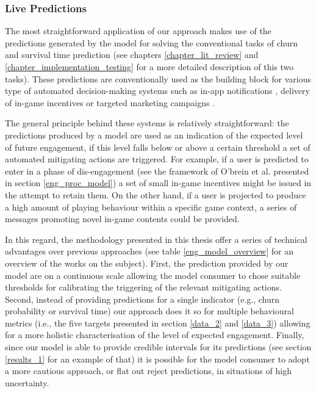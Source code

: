 \subsubsection{Live Predictions}
The most straightforward application of our approach makes use of the predictions generated by the model for solving the conventional tasks of churn and survival time prediction (see chapters \ref{chapter_lit_review} and \ref{chapter_implementation_testing} for a more detailed description of this two tasks). These predictions are conventionally used as the building block for various type of automated decision-making systems such as in-app notifications \cite{milovsevic2017early}, delivery of in-game incentives or targeted marketing campaigns \cite{el2016game, el2021game}. 

The general principle behind these systems is relatively straightforward: the predictions produced by a model are used as an indication of the expected level of future engagement, if this level falls below or above a certain threshold a set of automated mitigating actions are triggered. For example, if a user is predicted to enter in a phase of dis-engagement (see the framework of O'brein et al. presented in section \ref{eng_proc_model}) a set of small in-game incentives might be issued in the attempt to retain them. On the other hand, if a user is projected to produce a high amount of playing behaviour within a specific game context, a series of messages promoting novel in-game contents could be provided.

In this regard, the methodology presented in this thesis offer a series of technical advantages over previous approaches (see table \ref{eng_model_overview} for an overview of the works on the subject). First, the prediction provided by our model are on a continuous scale allowing the model consumer to chose suitable thresholds for calibrating the triggering of the relevant mitigating actions. Second, instead of providing predictions for a single indicator (e.g., churn probability or survival time) our approach does it so for multiple behavioural metrics (i.e., the five targets presented in section \ref{data_2} and \ref{data_3}) allowing for a more holistic characterisation of the level of expected engagement. Finally, since our model is able to provide credible intervals for its predictions (see section \ref{results_1} for an example of that) it is possible for the model consumer to adopt a more cautious approach, or flat out reject predictions, in situations of high uncertainty.

